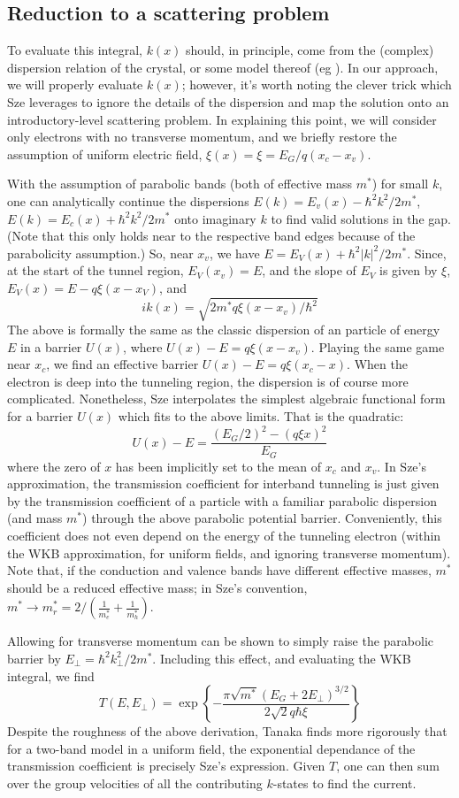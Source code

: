 \subsection{Reduction to a scattering problem}
To evaluate this integral, $k(x)$ should, in principle, come from the (complex) dispersion relation of the crystal, or some model thereof (eg \cite{Guan_2011}).  In our approach, we will properly evaluate $k(x)$; however, it's worth noting the clever trick which Sze leverages to ignore the details of the dispersion and map the solution onto an introductory-level scattering problem.  In explaining this point, we will consider only electrons with no transverse momentum, and we briefly restore the assumption of uniform electric field, $\xi(x)=\xi=E_G/q(x_c-x_v)$.

With the assumption of parabolic bands (both of effective mass $m^*$) for small $k$, one can  analytically continue the dispersions $E(k)=E_v(x)-\hbar^2k^2/2m^*$, $E(k)=E_c(x)+\hbar^2k^2/2m^*$ onto imaginary $k$ to find valid solutions in the gap.  (Note that this only holds near to the respective band edges because of the parabolicity assumption.)  So, near $x_v$, we have $E=E_V(x)+\hbar^2|k|^2/2m^*$.  Since, at the start of the tunnel region, $E_V(x_v)=E$, and the slope of $E_V$ is given by $\xi$, $E_V(x)=E-q\xi(x-x_V)$, and
$$ik(x)=\sqrt{2m^*q\xi(x-x_v)/\hbar^2}$$
The above is formally the same as the classic dispersion of an particle of energy $E$ in a barrier $U(x)$, where $U(x)-E=q\xi(x-x_v)$.  Playing the same game near $x_c$, we find an effective barrier $U(x)-E=q\xi(x_c-x)$.  When the electron is deep into the tunneling region, the dispersion is of course more complicated.  Nonetheless, Sze interpolates the simplest algebraic functional form for a barrier $U(x)$ which fits to the above limits.  That is the quadratic:
$$U(x)-E=\frac{(E_G/2)^2-(q\xi x)^2}{E_G}$$
where the zero of $x$ has been implicitly set to the mean of $x_c$ and $x_v$.  In Sze's approximation, the transmission coefficient for interband tunneling is just given by the transmission coefficient of a particle with a familiar parabolic dispersion (and mass $m^*$) through the above parabolic potential barrier.  Conveniently, this coefficient does not even depend on the energy of the tunneling electron (within the WKB approximation, for uniform fields, and ignoring transverse momentum).  Note that, if the conduction and valence bands have different effective masses, $m^*$ should be a reduced effective mass; in Sze's convention, $m^*\rightarrow m_r^*=2/(\frac{1}{m_e^*}+\frac{1}{m_h^*})$.

Allowing for transverse momentum can be shown to simply raise the parabolic barrier by $E_\perp=\hbar^2k_\perp^2/2m^*$.  Including this effect, and evaluating the WKB integral, we find
$$T(E,E_\perp)=\exp\left\{-\frac{\pi\sqrt{m^*}(E_G+2E_\perp)^{3/2}}{2\sqrt{2}q\hbar\xi}\right\}$$
Despite the roughness of the above derivation, Tanaka \cite{Tanaka_1994} finds more rigorously that for a two-band model in a uniform field, the exponential dependance of the transmission coefficient is precisely Sze's expression.  Given $T$, one can then sum over the group velocities of all the contributing $k$-states to find the current.